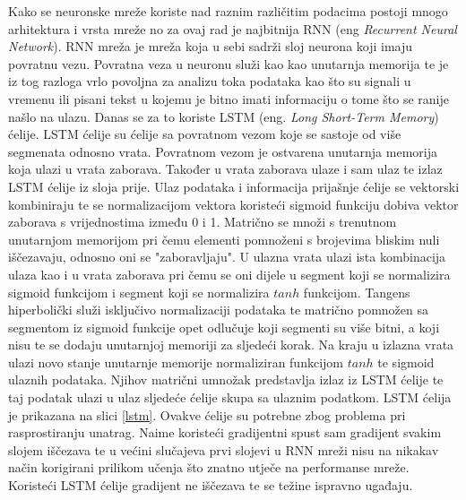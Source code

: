 \documentclass[times, utf8, diplomski]{fer}
\begin{document}
Kako se neuronske mreže koriste nad raznim različitim podacima postoji mnogo arhitektura i vrsta mreže no za
ovaj rad je najbitnija RNN (eng \textit{Recurrent Neural Network}). RNN mreža je mreža koja u sebi sadrži
sloj neurona koji imaju povratnu vezu. Povratna veza u neuronu služi kao kao unutarnja memorija te je iz tog razloga
vrlo povoljna za analizu toka podataka kao što su signali u vremenu ili pisani tekst u kojemu je bitno imati informaciju
o tome što se ranije našlo na ulazu. Danas se za to koriste LSTM (eng. \textit{Long Short-Term Memory}) ćelije.
LSTM ćelije su ćelije sa povratnom vezom koje se sastoje od više segmenata odnosno vrata. Povratnom vezom
je ostvarena unutarnja memorija koja ulazi u vrata zaborava. Također u vrata zaborava ulaze i sam ulaz te
izlaz LSTM ćelije iz sloja prije. Ulaz podataka i informacija prijašnje ćelije se vektorski kombiniraju te
se normalizacijom vektora koristeći sigmoid funkciju dobiva vektor zaborava s vrijednostima između 0 i 1.
Matrično se množi s trenutnom unutarnjom memorijom pri čemu elementi pomnoženi s brojevima bliskim nuli
iščezavaju, odnosno oni se "zaboravljaju". U ulazna vrata ulazi ista kombinacija ulaza kao i u vrata zaborava
pri čemu se oni dijele u segment koji se normalizira sigmoid funkcijom i segment koji se normalizira $tanh$
funkcijom. Tangens hiperbolički služi isključivo normalizaciji podataka te matrično pomnožen sa segmentom
iz sigmoid funkcije opet odlučuje koji segmenti su više bitni, a koji nisu te se dodaju unutarnjoj memoriji
za sljedeći korak. Na kraju u izlazna vrata ulazi novo stanje unutarnje memorije normaliziran funkcijom
$tanh$ te sigmoid ulaznih podataka. Njihov matrični umnožak predstavlja izlaz iz LSTM ćelije te taj podatak
ulazi u ulaz sljedeće ćelije skupa sa ulaznim podatkom. LSTM ćelija je prikazana na slici \ref{lstm}.
Ovakve ćelije su potrebne zbog problema pri rasprostiranju unatrag. Naime koristeći gradijentni spust sam
gradijent svakim slojem iščezava te u većini slučajeva prvi slojevi u RNN mreži nisu na nikakav način korigirani
prilikom učenja što znatno utječe na performanse mreže. Koristeći LSTM ćelije gradijent ne iščezava te
se težine ispravno ugađaju.
\end{document}
